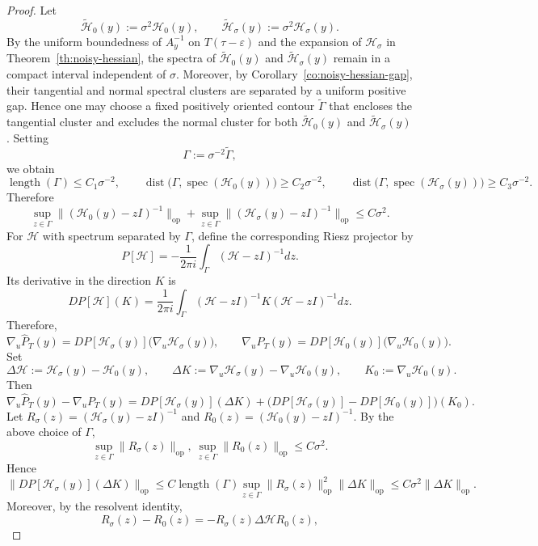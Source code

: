 \documentclass[11pt]{article}
\theoremstyle{plain}
\theoremstyle{definition}
\begin{document}
\begin{proof}
Let
\[
\widetilde {\mathcal H}_0(y):=\sigma^2 \mathcal H_0(y),
\qquad
\widetilde {\mathcal H}_\sigma(y):=\sigma^2 \mathcal H_\sigma(y).
\]
By the uniform boundedness of $A_y^{-1}$ on $T(\tau-\varepsilon)$ and the expansion of $\mathcal H_\sigma$ in Theorem~\ref{th:noisy-hessian}, the spectra of $\widetilde {\mathcal H}_0(y)$ and $\widetilde {\mathcal H}_\sigma(y)$ remain in a compact interval independent of $\sigma$. Moreover, by Corollary~\ref{co:noisy-hessian-gap}, their tangential and normal spectral clusters are separated by a uniform positive gap.
Hence one may choose a fixed positively oriented contour $\widetilde\Gamma$ that encloses the tangential cluster and excludes the normal cluster for both $\widetilde {\mathcal H}_0(y)$ and $\widetilde {\mathcal H}_\sigma(y)$.
Setting
\[
\Gamma:=\sigma^{-2}\widetilde\Gamma,
\]
we obtain
\[
\operatorname{length}(\Gamma)\le C_1\sigma^{-2},
\qquad
\operatorname{dist}\big(\Gamma,\operatorname{spec}(\mathcal H_0(y))\big)\ge C_2\sigma^{-2},
\qquad
\operatorname{dist}\big(\Gamma,\operatorname{spec}(\mathcal H_\sigma(y))\big)\ge C_3\sigma^{-2}.
\]
Therefore
\[
\sup_{z\in\Gamma}\|(\mathcal H_0(y)-zI)^{-1}\|_{\mathrm{op}}
+
\sup_{z\in\Gamma}\|(\mathcal H_\sigma(y)-zI)^{-1}\|_{\mathrm{op}}
\le C\sigma^2.
\]
For $\mathcal H$ with spectrum separated by $\Gamma$, define the corresponding Riesz projector by
\[
P[\mathcal H]=-\frac{1}{2\pi i}\int_{\Gamma}(\mathcal H-zI)^{-1}dz.
\]
Its derivative in the direction $K$ is
\[
DP[\mathcal H](K)=\frac{1}{2\pi i}\int_{\Gamma}(\mathcal H-zI)^{-1}K(\mathcal H-zI)^{-1}dz.
\]
Therefore,
\[
\nabla_u\widehat P_T(y)
=
DP[\mathcal H_\sigma(y)]\big(\nabla_u\mathcal H_\sigma(y)\big),
\qquad
\nabla_uP_T(y)
=
DP[\mathcal H_0(y)]\big(\nabla_u\mathcal H_0(y)\big).
\]
Set
\[
\Delta \mathcal H:=\mathcal H_\sigma(y)-\mathcal H_0(y),
\qquad
\Delta K:=\nabla_u\mathcal H_\sigma(y)-\nabla_u\mathcal H_0(y),
\qquad
K_0:=\nabla_u\mathcal H_0(y).
\]
Then
\[
\nabla_u\widehat P_T(y)-\nabla_uP_T(y)
=
DP[\mathcal H_\sigma(y)](\Delta K)
+
\big(DP[\mathcal H_\sigma(y)]-DP[\mathcal H_0(y)]\big)(K_0).
\]
Let $R_\sigma(z)=(\mathcal H_\sigma(y)-zI)^{-1}$ and
$R_0(z)=(\mathcal H_0(y)-zI)^{-1}$. By the above choice of $\Gamma$,
\[
\sup_{z\in\Gamma}\|R_\sigma(z)\|_{\mathrm{op}}
,\ 
\sup_{z\in\Gamma}\|R_0(z)\|_{\mathrm{op}}
\le C\sigma^2.
\]
Hence
\[
\|DP[\mathcal H_\sigma(y)](\Delta K)\|_{\mathrm{op}}
\le
C\operatorname{length}(\Gamma)
\sup_{z\in\Gamma}\|R_\sigma(z)\|_{\mathrm{op}}^2
\|\Delta K\|_{\mathrm{op}}
\le
C\sigma^2\|\Delta K\|_{\mathrm{op}}.
\]
Moreover, by the resolvent identity,
\[
R_\sigma(z)-R_0(z)
=
-R_\sigma(z)\Delta \mathcal HR_0(z),
\]
\end{proof}
\end{document}
